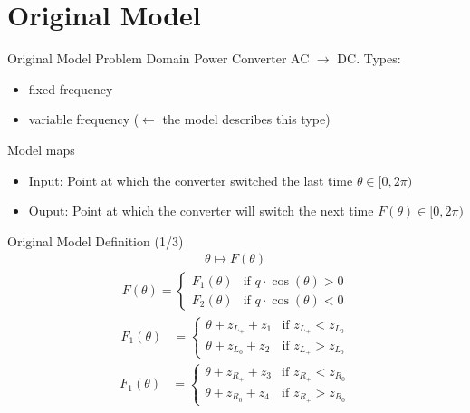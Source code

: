 
\section{Original Model}

\begin{frame}{Original Model Problem Domain}
    Power Converter AC $\to$ DC.
    Types:
    \begin{itemize}
        \item fixed frequency
        \item variable frequency ($\leftarrow$ the model describes this type)
    \end{itemize}

    \vspace{2em}
    Model maps
    \begin{itemize}
        \item Input: Point at which the converter switched the last time $\theta \in [0, 2 \pi)$
        \item Ouput: Point at which the converter will switch the next time $F(\theta) \in [0, 2 \pi)$
    \end{itemize}
\end{frame}

\begin{frame}{Original Model Definition (1/3)}
    \vspace{-3.0em}
    \begin{align}
        \theta \mapsto F(\theta)
    \end{align}
    \begin{align}
        F(\theta) = \begin{cases}
                        F_1(\theta) & \text{if } q \cdot \cos(\theta) > 0 \\
                        F_2(\theta) & \text{if } q \cdot \cos(\theta) < 0
                    \end{cases}
    \end{align}
    \begin{align}
        F_1(\theta) & = \begin{cases}
                            \theta + z_{L_+} + z_1 & \text{if } z_{L_+} < z_{L_0} \\
                            \theta + z_{L_0} + z_2 & \text{if } z_{L_+} > z_{L_0}
                        \end{cases}
    \end{align}
    \begin{align}
        F_1(\theta) & = \begin{cases}
                            \theta + z_{R_+} + z_3 & \text{if } z_{R_+} < z_{R_0} \\
                            \theta + z_{R_0} + z_4 & \text{if } z_{R_+} > z_{R_0}
                        \end{cases}
    \end{align}
\end{frame}


